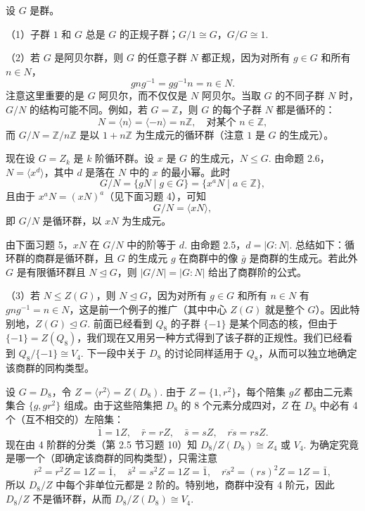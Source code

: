 \begin{example}
设 \(G\) 是群。

（1）子群 \(1\) 和 \(G\) 总是 \(G\) 的正规子群；\(G/1 \cong G\)，\(G/G \cong 1\).

（2）若 \(G\) 是阿贝尔群，则 \(G\) 的任意子群 \(N\) 都正规，因为对所有 \(g \in G\) 和所有 \(n \in N\)，
\[
gng^{-1} = gg^{-1}n = n \in N.
\]
注意这里重要的是 \(G\) 阿贝尔，而不仅仅是 \(N\) 阿贝尔。当取 \(G\) 的不同子群 \(N\) 时，\(G/N\) 的结构可能不同。例如，若 \(G = \mathbb{Z}\)，则 \(G\) 的每个子群 \(N\) 都是循环的：
\[
N = \langle n \rangle = \langle -n \rangle = n\mathbb{Z}, \quad \text{对某个 } n \in \mathbb{Z},
\]
而 \(G/N = \mathbb{Z}/n\mathbb{Z}\) 是以 \(1 + n\mathbb{Z}\) 为生成元的循环群（注意 \(1\) 是 \(G\) 的生成元）。

现在设 \(G = Z_k\) 是 \(k\) 阶循环群。设 \(x\) 是 \(G\) 的生成元，\(N \leq G\). 由命题 2.6，\(N = \langle x^d \rangle\)，其中 \(d\) 是落在 \(N\) 中的 \(x\) 的最小幂。此时
\[
G/N = \{gN \mid g \in G\} = \{x^a N \mid a \in \mathbb{Z}\},
\]
且由于 \(x^a N = (xN)^a\)（见下面习题 4），可知
\[
G/N = \langle xN \rangle,
\]
即 \(G/N\) 是循环群，以 \(xN\) 为生成元。

由下面习题 5，\(xN\) 在 \(G/N\) 中的阶等于 \(d\). 由命题 2.5，\(d = |G : N|\). 总结如下：循环群的商群是循环群，且 \(G\) 的生成元 \(g\) 在商群中的像 \(\bar{g}\) 是商群的生成元。若此外 \(G\) 是有限循环群且 \(N \trianglelefteq G\)，则 \(|G/N| = |G : N|\) 给出了商群阶的公式。

（3）若 \(N \leq Z(G)\)，则 \(N \trianglelefteq G\)，因为对所有 \(g \in G\) 和所有 \(n \in N\) 有 \(gng^{-1} = n \in N\)，这是前一个例子的推广（其中中心 \(Z(G)\) 就是整个 \(G\)）。因此特别地，\(Z(G) \trianglelefteq G\). 前面已经看到 \(Q_8\) 的子群 \(\{-1\}\) 是某个同态的核，但由于 \(\{-1\} = Z(Q_8)\)，我们现在又用另一种方式得到了该子群的正规性。我们已经看到 \(Q_8/\{-1\} \cong V_4\). 下一段中关于 \(D_8\) 的讨论同样适用于 \(Q_8\)，从而可以独立地确定该商群的同构类型。

设 \(G = D_8\)，令 \(Z = \langle r^2 \rangle = Z(D_8)\). 由于 \(Z = \{1, r^2\}\)，每个陪集 \(gZ\) 都由二元素集合 \(\{g, gr^2\}\) 组成。由于这些陪集把 \(D_8\) 的 8 个元素分成四对，\(Z\) 在 \(D_8\) 中必有 4 个（互不相交的）左陪集：
\[
\bar{1} = 1Z, \quad \bar{r} = rZ, \quad \bar{s} = sZ, \quad \overline{rs} = rsZ.
\]
现在由 4 阶群的分类（第 2.5 节习题 10）知 \(D_8/Z(D_8) \cong Z_4\) 或 \(V_4\). 为确定究竟是哪一个（即确定该商群的同构类型），只需注意
\[
\bar{r}^2 = r^2 Z = 1Z = \bar{1}, \quad \bar{s}^2 = s^2 Z = 1Z = \bar{1}, \quad \overline{rs}^2 = (rs)^2 Z = 1Z = \bar{1},
\]
所以 \(D_8/Z\) 中每个非单位元都是 2 阶的。特别地，商群中没有 4 阶元，因此 \(D_8/Z\) 不是循环群，从而 \(D_8/Z(D_8) \cong V_4\).
\end{example}

